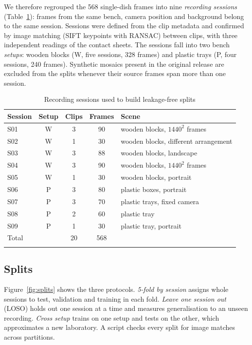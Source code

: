 \documentclass[pdflatex,sn-basic,Numbered]{sn-jnl}
\theoremstyle{thmstyleone}%
\begin{document}
We therefore regrouped the 568 single-dish frames into nine \emph{recording sessions} (Table~\ref{tab:sessions}): frames from the same bench, camera position and background belong to the same session. Sessions were defined from the clip metadata and confirmed by image matching (SIFT keypoints with RANSAC) between clips, with three independent readings of the contact sheets. The sessions fall into two bench \emph{setups}: wooden blocks (W, five sessions, 328 frames) and plastic trays (P, four sessions, 240 frames). Synthetic mosaics present in the original release are excluded from the splits whenever their source frames span more than one session.

\begin{table}[t]
\caption{Recording sessions used to build leakage-free splits}\label{tab:sessions}
\begin{tabular*}{\textwidth}{@{\extracolsep\fill}lcccl}
\toprule
Session & Setup & Clips & Frames & Scene \\
\midrule
S01 & W & 3 & 90 & wooden blocks, $1440^2$ frames \\
S02 & W & 1 & 30 & wooden blocks, different arrangement \\
S03 & W & 3 & 88 & wooden blocks, landscape \\
S04 & W & 3 & 90 & wooden blocks, $1440^2$ frames \\
S05 & W & 1 & 30 & wooden blocks, portrait \\
S06 & P & 3 & 80 & plastic boxes, portrait \\
S07 & P & 3 & 70 & plastic trays, fixed camera \\
S08 & P & 2 & 60 & plastic tray \\
S09 & P & 1 & 30 & plastic tray, portrait \\
\midrule
Total & & 20 & 568 & \\
\botrule
\end{tabular*}
\end{table}

\subsection{Splits}\label{sec:splits}

Figure~\ref{fig:splits} shows the three protocols. \emph{5-fold by session} assigns whole sessions to test, validation and training in each fold. \emph{Leave one session out} (LOSO) holds out one session at a time and measures generalisation to an unseen recording. \emph{Cross setup} trains on one setup and tests on the other, which approximates a new laboratory. A script checks every split for image matches across partitions.
\end{document}
